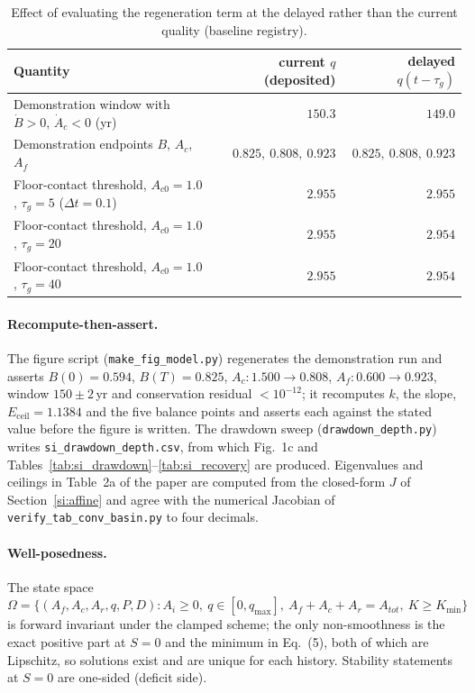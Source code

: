 \documentclass[11pt,a4paper]{article}
\newcommand{\Eceil}{E_{\mathrm{ceil}}}
\begin{document}
\begin{table}[htbp]
\centering\small
\caption{Effect of evaluating the regeneration term at the delayed rather than the current quality (baseline registry).}
\label{tab:si_delay}
\begin{tabular}{l r r}
\toprule
Quantity & current $q$ (deposited) & delayed $q(t-\tau_g)$ \\
\midrule
Demonstration window with $\dot B>0$, $\dot A_c<0$ (yr) & $150.3$ & $149.0$ \\
Demonstration endpoints $B$, $A_c$, $A_f$ & $0.825,\ 0.808,\ 0.923$ & $0.825,\ 0.808,\ 0.923$ \\
Floor-contact threshold, $A_{c0}=1.0$, $\tau_g=5$ ($\Delta t=0.1$) & $2.955$ & $2.955$ \\
Floor-contact threshold, $A_{c0}=1.0$, $\tau_g=20$ & $2.955$ & $2.954$ \\
Floor-contact threshold, $A_{c0}=1.0$, $\tau_g=40$ & $2.955$ & $2.954$ \\
\bottomrule
\end{tabular}
\end{table}

\paragraph{Recompute-then-assert.} The figure script (\texttt{make\_fig\_model.py}) regenerates the demonstration run and asserts $B(0)=0.594$, $B(T)=0.825$, $A_c:1.500\to0.808$, $A_f:0.600\to0.923$, window $150\pm2$\,yr and conservation residual $<10^{-12}$; it recomputes $k$, the slope, $\Eceil=1.1384$ and the five balance points and asserts each against the stated value before the figure is written. The drawdown sweep (\texttt{drawdown\_depth.py}) writes \texttt{si\_drawdown\_depth.csv}, from which Fig.~1c and Tables~\ref{tab:si_drawdown}--\ref{tab:si_recovery} are produced. Eigenvalues and ceilings in Table~2a of the paper are computed from the closed-form $J$ of Section~\ref{si:affine} and agree with the numerical Jacobian of \texttt{verify\_tab\_conv\_basin.py} to four decimals.

\paragraph{Well-posedness.} The state space $\Omega=\{(A_f,A_c,A_r,q,P,D):A_i\ge0,\ q\in[0,q_{\max}],\ A_f+A_c+A_r=A_{tot},\ K\ge K_{\min}\}$ is forward invariant under the clamped scheme; the only non-smoothness is the exact positive part at $S=0$ and the minimum in Eq.~(5), both of which are Lipschitz, so solutions exist and are unique for each history. Stability statements at $S=0$ are one-sided (deficit side).
\end{document}
